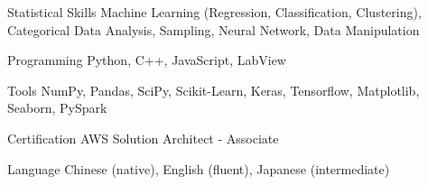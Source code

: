 


\begin{cvskills}

  
\cvskill
{Statistical Skills}
{Machine Learning (Regression, Classification, Clustering), Categorical Data
  Analysis, Sampling, Neural Network, Data Manipulation}

\cvskill
{Programming}
{Python, C++, JavaScript, LabView}


\cvskill
{Tools}
{NumPy, Pandas, SciPy, Scikit-Learn, Keras, Tensorflow, Matplotlib, Seaborn,
  PySpark}


\cvskill
{Certification}
{AWS Solution Architect - Associate}


\cvskill
{Language}
{Chinese (native), English (fluent), Japanese (intermediate)}


\end{cvskills}